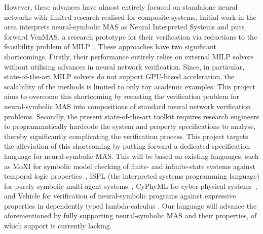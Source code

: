 \documentclass[11pt]{article}
\begin{document}
However, these advances have almost entirely focused on
standalone neural networks with limited research realised
for composite systems.  Initial work in the area interprets
neural-symbolic MAS as Neural Interpreted Systems and puts
forward {\sc VenMAS}, a research prototype for their
verification via reductions to the feasibility problem of
MILP~\cite{Akintunde+18,Akintunde+20,Akintunde+22,KouvarosBB24}.
These approaches have two significant shortcomings. Firstly,
their performance entirely relies on external MILP solvers
without utilising advances in neural network verification.
Since, in particular, state-of-the-art MILP solvers do
not support GPU-based acceleration, the scalability of the
methods is limited to only toy academic examples. This
project aims to overcome this shortcoming by recasting the
verification problem for neural-symbolic MAS into
compositions of standard neural network verification
problems. Secondly, the present state-of-the-art toolkit
requires  research engineers  to programmatically
hardcode the system and property specifications to analyse,
thereby significantly complicating the verification process.
This project targets the alleviation of this shortcoming by
putting forward a dedicated specification language for
neural-symbolic MAS.  This will be based on existing
languages, such as MoXI for symbolic model checking of
finite- and infinite-state systems against temporal logic
properties~\cite{Rozier+2024}, ISPL (the interpreted systems
programming language) for purely symbolic multi-agent
systems~\cite{LomuscioQR17}, CyPhyML for cyber-physical
systems~\cite{Simko+13}, and Vehicle for verification of
neural-symbolic programs against expressive properties in
dependently typed lambda-calculus \cite{Daggitt+24}. Our
language will advance the aforementioned by fully supporting
neural-symbolic MAS and their properties, of which  support is
currently lacking.


\end{document}

